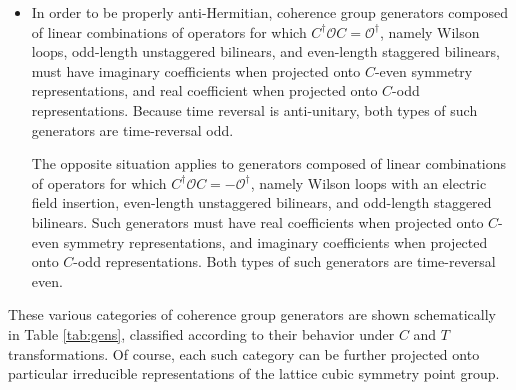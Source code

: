 \documentclass [12pt]{article}
\begin{document}
\begin{itemize}
\item
    In order to be properly anti-Hermitian, coherence group generators composed
    of linear combinations of operators for which
    $C^\dagger \mathcal O C = \mathcal O^\dagger$,
    namely Wilson loops, odd-length unstaggered bilinears,
    and even-length staggered bilinears,
    must have imaginary coefficients when projected onto $C$-even
    symmetry representations, and real coefficient when projected onto
    $C$-odd representations.
    Because time reversal is anti-unitary, both types of such generators are
    time-reversal odd.

    The opposite situation applies to generators composed
    of linear combinations of operators for which
    $C^\dagger \mathcal O C = -\mathcal O^\dagger$,
    namely Wilson loops with an electric field insertion,
    even-length unstaggered bilinears,
    and odd-length staggered bilinears.
    Such generators must have real coefficients when projected
    onto $C$-even symmetry representations, and imaginary
    coefficients when projected onto $C$-odd representations.
    Both types of such generators are time-reversal even.

\end{itemize}

These various categories of coherence group generators are
shown schematically in Table \ref{tab:gens}, classified according
to their behavior under $C$ and $T$ transformations.
Of course, each such category can be further projected onto
particular irreducible representations of the lattice cubic
symmetry point group.
\end{document}
